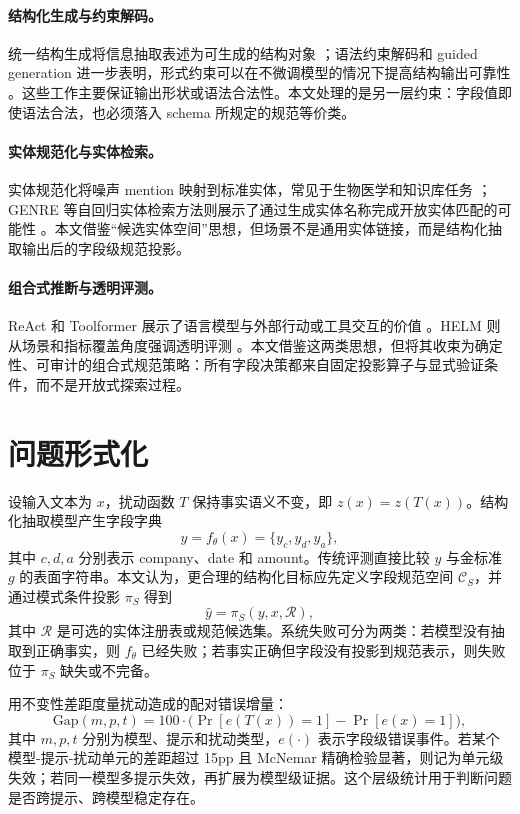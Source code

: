 ﻿\documentclass[UTF8,11pt,a4paper]{ctexart}
\newcommand{\gap}{\mathrm{Gap}}
\newcommand{\pp}{pp}
\begin{document}
\paragraph{结构化生成与约束解码。}
统一结构生成将信息抽取表述为可生成的结构对象 \cite{lu-etal-2022-unified}；语法约束解码和 guided generation 进一步表明，形式约束可以在不微调模型的情况下提高结构输出可靠性 \cite{geng-etal-2023-grammar,willard-louf-2023-guided}。这些工作主要保证输出形状或语法合法性。本文处理的是另一层约束：字段值即使语法合法，也必须落入 schema 所规定的规范等价类。

\paragraph{实体规范化与实体检索。}
实体规范化将噪声 mention 映射到标准实体，常见于生物医学和知识库任务 \cite{ji-etal-2020-bert-normalization}；GENRE 等自回归实体检索方法则展示了通过生成实体名称完成开放实体匹配的可能性 \cite{de-cao-etal-2021-autoregressive}。本文借鉴“候选实体空间”思想，但场景不是通用实体链接，而是结构化抽取输出后的字段级规范投影。

\paragraph{组合式推断与透明评测。}
ReAct 和 Toolformer 展示了语言模型与外部行动或工具交互的价值 \cite{yao-etal-2023-react,schick-etal-2023-toolformer}。HELM 则从场景和指标覆盖角度强调透明评测 \cite{liang-etal-2022-helm}。本文借鉴这两类思想，但将其收束为确定性、可审计的组合式规范策略：所有字段决策都来自固定投影算子与显式验证条件，而不是开放式探索过程。

\section{问题形式化}

设输入文本为 $x$，扰动函数 $T$ 保持事实语义不变，即 $z(x)=z(T(x))$。结构化抽取模型产生字段字典
\[
  y=f_\theta(x)=\{y_c,y_d,y_a\},
\]
其中 $c,d,a$ 分别表示 company、date 和 amount。传统评测直接比较 $y$ 与金标准 $g$ 的表面字符串。本文认为，更合理的结构化目标应先定义字段规范空间 $\mathcal{C}_S$，并通过模式条件投影 $\pi_S$ 得到
\[
  \hat{y}=\pi_S(y,x,\mathcal{R}),
\]
其中 $\mathcal{R}$ 是可选的实体注册表或规范候选集。系统失败可分为两类：若模型没有抽取到正确事实，则 $f_\theta$ 已经失败；若事实正确但字段没有投影到规范表示，则失败位于 $\pi_S$ 缺失或不完备。

用不变性差距度量扰动造成的配对错误增量：
\[
  \gap(m,p,t)=100\cdot
  \bigl(\Pr[e(T(x))=1]-\Pr[e(x)=1]\bigr),
\]
其中 $m,p,t$ 分别为模型、提示和扰动类型，$e(\cdot)$ 表示字段级错误事件。若某个模型-提示-扰动单元的差距超过 15\pp{} 且 McNemar 精确检验显著，则记为单元级失效；若同一模型多提示失效，再扩展为模型级证据。这个层级统计用于判断问题是否跨提示、跨模型稳定存在。
\end{document}
